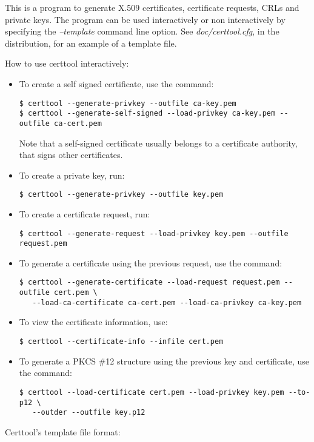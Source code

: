 This is a program to generate X.509 certificates, certificate requests, CRLs and
private keys. The program can be used interactively or non interactively by
specifying the \emph{--template} command line option. See \emph{doc/certtool.cfg},
in the distribution, for an example of a template file.

How to use certtool interactively:

\begin{itemize}

\item To create a self signed certificate, use the command:
\begin{verbatim}
$ certtool --generate-privkey --outfile ca-key.pem
$ certtool --generate-self-signed --load-privkey ca-key.pem --outfile ca-cert.pem
\end{verbatim}
Note that a self-signed certificate usually belongs to a certificate
authority, that signs other certificates.

\item To create a private key, run:
\begin{verbatim}
$ certtool --generate-privkey --outfile key.pem
\end{verbatim}

\item To create a certificate request, run:
\begin{verbatim}
$ certtool --generate-request --load-privkey key.pem --outfile request.pem
\end{verbatim}

\item To generate a certificate using the previous request, use the command:
\begin{verbatim}
$ certtool --generate-certificate --load-request request.pem --outfile cert.pem \
   --load-ca-certificate ca-cert.pem --load-ca-privkey ca-key.pem
\end{verbatim}

\item To view the certificate information, use:
\begin{verbatim}
$ certtool --certificate-info --infile cert.pem
\end{verbatim}

\item To generate a PKCS \#12 structure using the previous key and certificate, use the command:
\begin{verbatim}
$ certtool --load-certificate cert.pem --load-privkey key.pem --to-p12 \
   --outder --outfile key.p12
\end{verbatim}


\end{itemize}
\par
Certtool's template file format:

